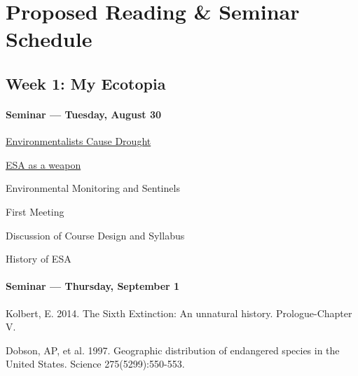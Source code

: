 \clearpage
\section{Proposed Reading \& Seminar Schedule}	

\subsection{\textbf{Week 1}: My Ecotopia}

\paragraph{Seminar --- Tuesday, August 30}

\begin{itemize*}

\item \href{http://video.foxbusiness.com/v/4184405298001/californias-drought-a-man-made-crisis/?#sp=show-clips}{Environmentalists Cause Drought}		
  \item \href{http://video.foxbusiness.com/v/2016991509001/government-using-endangered-species-act-against-oil-industry/?#sp=show-clips}{ESA as a weapon}	
    \item Environmental Monitoring and Sentinels
    \item First Meeting	
    
      
      \item Discussion of Course Design and Syllabus
      \item History of ESA
      \end{itemize*}
      
    
      \paragraph{Seminar --- Thursday, September 1}
      
      \begin{itemize*}
      \item Kolbert, E. 2014. The Sixth Extinction: An unnatural history. Prologue-Chapter V.
      \item Dobson, AP, et al. 1997. Geographic distribution of endangered species in the United States. Science 275(5299):550-553.
      \end{itemize*}
      

